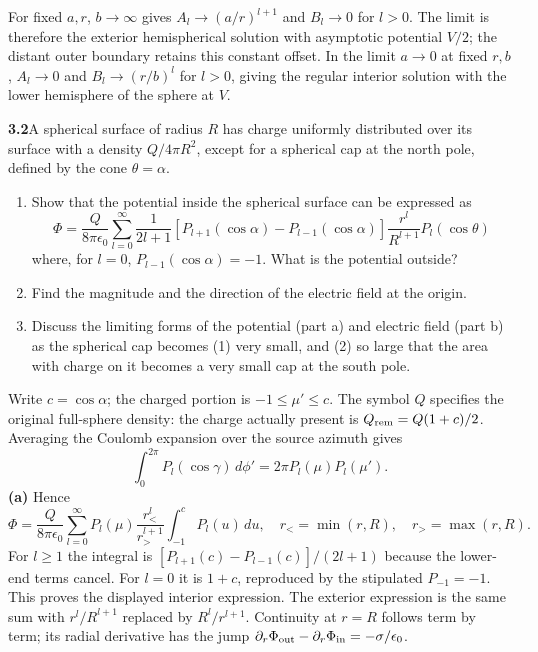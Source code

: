 For fixed $a,r$, $b\to\infty$ gives $A_l\to(a/r)^{l+1}$ and
$B_l\to0$ for $l>0$.  The limit is therefore the exterior hemispherical
solution with asymptotic potential $V/2$; the distant outer boundary
retains this constant offset.  In the limit $a\to0$ at fixed $r,b$,
$A_l\to0$ and $B_l\to(r/b)^l$ for $l>0$, giving the regular interior
solution with the lower hemisphere of the sphere at $V$.

\par\bigskip
\noindent\textbf{3.2}\quad A spherical surface of radius $R$ has charge uniformly distributed over its surface with a density $Q/4\pi R^{2}$, except for a spherical cap at the north pole, defined by the cone $\theta=\alpha$.
\begin{enumerate}
\item[(a)] Show that the potential inside the spherical surface can be expressed as
\[
\Phi=\frac{Q}{8\pi\epsilon_{0}}\sum_{l=0}^{\infty}\frac{1}{2l+1}\left[P_{l+1}(\cos\alpha)-P_{l-1}(\cos\alpha)\right]\frac{r^{l}}{R^{l+1}}P_{l}(\cos\theta)
\]
where, for $l=0$, $P_{l-1}(\cos\alpha)=-1$. What is the potential outside?
\item[(b)] Find the magnitude and the direction of the electric field at the origin.
\item[(c)] Discuss the limiting forms of the potential (part a) and electric field (part b) as the spherical cap becomes (1) very small, and (2) so large that the area with charge on it becomes a very small cap at the south pole.
\end{enumerate}
\solution

Write $c=\cos\alpha$; the charged portion is $-1\leq\mu'\leq c$.
The symbol $Q$ specifies the original full-sphere density: the charge
actually present is $Q_{\rm rem}=Q(1+c)/2$.
Averaging the Coulomb expansion over the source azimuth gives
\[
\int_0^{2\pi}P_l(\cos\gamma)\,d\phi'
=2\pi P_l(\mu)P_l(\mu').
\]
\textbf{(a)} Hence
\[
\Phi=\frac{Q}{8\pi\epsilon_0}
\sum_{l=0}^\infty P_l(\mu)\frac{r_<^l}{r_>^{l+1}}
\int_{-1}^cP_l(u)\,du,
\quad r_<=\min(r,R),\quad r_>=\max(r,R).
\]
For $l\geq1$ the integral is
$[P_{l+1}(c)-P_{l-1}(c)]/(2l+1)$ because the lower-end terms cancel.
For $l=0$ it is $1+c$, reproduced by the stipulated $P_{-1}=-1$.
This proves the displayed interior expression.  The exterior expression
is the same sum with $r^l/R^{l+1}$ replaced by $R^l/r^{l+1}$.
Continuity at $r=R$ follows term by term; its radial derivative has the
jump $\partial_r\Phi_{\rm out}-\partial_r\Phi_{\rm in}=-\sigma/\epsilon_0$.

